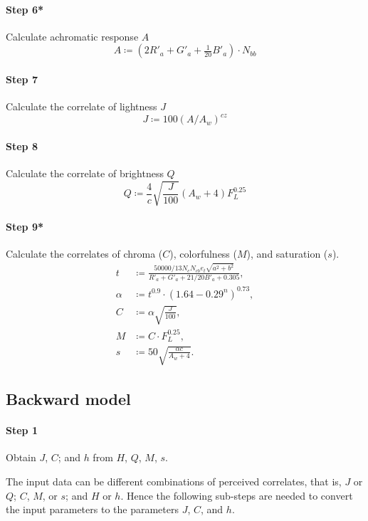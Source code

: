 \documentclass[twocolumn]{scrartcl}
\begin{document}
\paragraph{Step 6*}{%
Calculate achromatic response $A$
\[
  A\coloneqq (2 R'_a + G'_a + \tfrac{1}{20} B'_a) \cdot N_{bb}
  \]
}

\paragraph{Step 7}{%
Calculate the correlate of lightness $J$
\[
  J \coloneqq 100 {(A / A_w)}^{cz}
  \]
}

\paragraph{Step 8}{%
  Calculate the correlate of brightness $Q$
  \[
    Q \coloneqq \frac{4}{c} \sqrt{\frac{J}{100}} (A_w+4) F_L^{0.25}
    \]
  }

\paragraph{Step 9*}{%
Calculate the correlates of chroma ($C$), colorfulness
($M$), and saturation ($s$).
\begin{align*}
  t&\coloneqq \frac{50000/13 N_c N_{cb} e_t \sqrt{a^2 + b^2}}{R'_a + G'_a + 21/20 B'_a + 0.305},\\
  \alpha&\coloneqq t^{0.9} \cdot {(1.64 - 0.29^n)}^{0.73},\\
  C&\coloneqq \alpha \sqrt{\frac{J}{100}},\\
  M&\coloneqq C\cdot F_L^{0.25},\\
  s &\coloneqq 50 \sqrt{\frac{\alpha c}{A_w + 4}}.
\end{align*}
  }


\subsection{Backward model}

\paragraph{Step 1}{%
  Obtain $J$, $C$; and $h$ from $H$, $Q$, $M$, $s$.

  The input data can be different combinations of perceived correlates, that
  is, $J$ or $Q$; $C$, $M$, or $s$; and $H$ or $h$. Hence the following
  sub-steps are needed to convert the input parameters to the parameters $J$,
  $C$, and $h$.
  }
\end{document}
